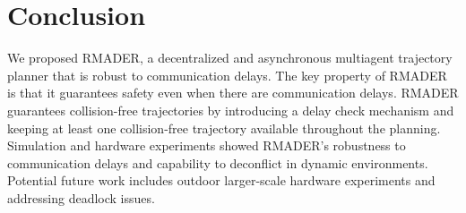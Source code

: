 \chapter{Conclusion}

We proposed RMADER, a decentralized and asynchronous multiagent trajectory planner that is robust to communication delays. The key property of RMADER is that it guarantees safety even when there are communication delays. RMADER guarantees collision-free trajectories by introducing a delay check mechanism and keeping at least one collision-free trajectory available throughout the planning. Simulation and hardware experiments showed RMADER's robustness to communication delays and capability to deconflict in dynamic environments. Potential future work includes outdoor larger-scale hardware experiments and addressing deadlock issues.